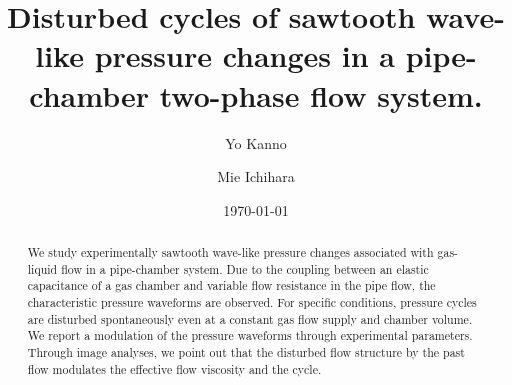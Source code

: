 \documentclass[aps,pre,preprint,groupedaddress,showkeys]{revtex4-2}
\begin{document}

\title{Disturbed cycles of sawtooth wave-like pressure changes in a pipe-chamber two-phase flow system.}


\author{Yo Kanno}

\author{Mie Ichihara}



\date{\today}
\begin{abstract}
We study experimentally sawtooth wave-like pressure changes associated with gas-liquid flow in a pipe-chamber system.
Due to the coupling between an elastic capacitance of a gas chamber and variable flow resistance in the pipe flow, the characteristic pressure waveforms are observed.
For specific conditions, pressure cycles are disturbed spontaneously even at a constant gas flow supply and chamber volume.
We report a modulation of the pressure waveforms through experimental parameters.  
Through image analyses, we point out that the disturbed flow structure by the past flow modulates the effective flow viscosity and the cycle.
\end{abstract}
\end{document}
